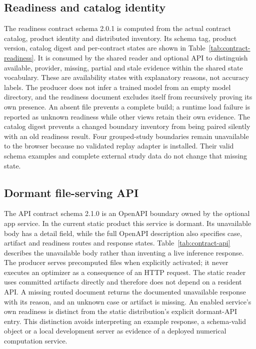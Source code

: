 \subsection{Readiness and catalog identity}\label{sec:contract-readiness}
The readiness contract schema 2.0.1 is computed from the actual contract catalog,
product identity and distributed inventory. Its schema tag, product version,
catalog digest and per-contract states are shown in Table~\ref{tab:contract-readiness}.
It is consumed by the shared reader and optional API to distinguish available,
provider, missing, partial and stale evidence within the shared state vocabulary.
These are availability states with explanatory reasons, not accuracy labels.
The producer does not infer a trained model from an empty model directory, and
the readiness document excludes itself from recursively proving its own presence.
An absent file prevents a complete build; a runtime load failure is reported
as unknown readiness while other views retain their own evidence. The catalog
digest prevents a changed boundary inventory from being paired silently with an
old readiness result. Four grouped-study boundaries remain unavailable to the
browser because no validated replay adapter is installed. Their valid schema
examples and complete external study data do not change that missing state.


\subsection{Dormant file-serving API}\label{sec:contract-api}
The API contract schema 2.1.0 is an OpenAPI boundary owned by the optional app
service. In the current static product this service is dormant. Its unavailable
body has a detail field, while the full OpenAPI description also specifies
case, artifact and readiness routes and response states. Table~\ref{tab:contract-api}
describes the unavailable body rather than inventing a live inference response.
The producer serves precomputed files when explicitly activated; it never
executes an optimizer as a consequence of an HTTP request. The static reader
uses committed artifacts directly and therefore does not depend on a resident
API. A missing routed document returns the documented unavailable response
with its reason, and an unknown case or artifact is missing. An enabled
service's own readiness is distinct from the static distribution's explicit
dormant-API entry. This distinction avoids interpreting an example response,
a schema-valid object or a local development server as evidence of a deployed
numerical computation service.


